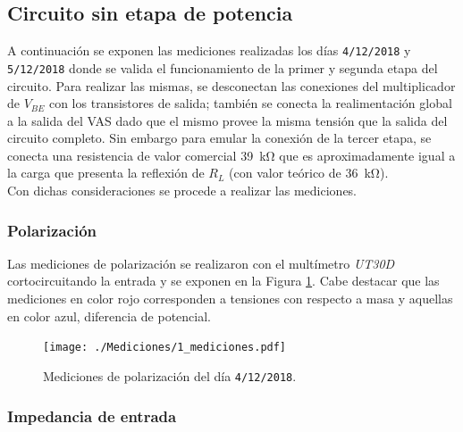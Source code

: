 
	\subsection{Circuito sin etapa de potencia}
		A continuación se exponen las mediciones realizadas los días \texttt{4/12/2018} y \texttt{5/12/2018} donde se valida el funcionamiento de la primer y segunda etapa del circuito. Para realizar las mismas, se desconectan las conexiones del multiplicador de $V_{BE}$ con los transistores de salida; también se conecta la realimentación global a la salida del VAS dado que el mismo provee la misma tensión que la salida del circuito completo. Sin embargo para emular la conexión de la tercer etapa, se conecta una resistencia de valor comercial \SI{39}{\kilo\ohm} que es aproximadamente igual a la carga que presenta la reflexión de $R_L$ (con valor teórico de \SI{36}{\kilo\ohm}).\\
		\indent Con dichas consideraciones se procede a realizar las mediciones.

		\subsubsection{Polarización}
		
		Las mediciones de polarización se realizaron con el multímetro \emph{UT30D} cortocircuitando la entrada y se exponen en la Figura \ref{fig:51218_pol}. Cabe destacar que las mediciones en color rojo corresponden a tensiones con respecto a masa y aquellas en color azul, diferencia de potencial.
		
		\begin{figure}[h!]
			\centering
			\texttt{[image: ./Mediciones/1\_mediciones.pdf]}
			\caption{Mediciones de polarización del día \texttt{4/12/2018}.}
			\label{fig:51218_pol}
		\end{figure}
		

		\subsubsection{Impedancia de entrada}
			
